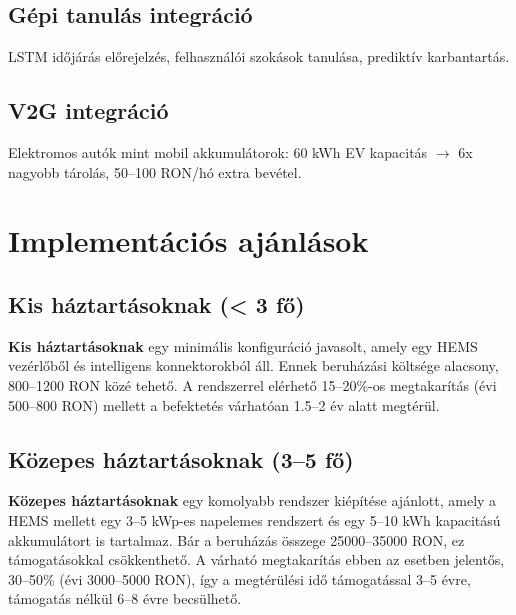 \subsection{Gépi tanulás integráció}
LSTM időjárás előrejelzés, felhasználói szokások tanulása, prediktív karbantartás.

\subsection{V2G integráció}
Elektromos autók mint mobil akkumulátorok: 60 kWh EV kapacitás $\rightarrow$ 6x nagyobb tárolás, 50--100 RON/hó extra bevétel.

\section{Implementációs ajánlások}
\subsection{Kis háztartásoknak (< 3 fő)}
\textbf{Kis háztartásoknak} egy minimális konfiguráció javasolt, amely egy HEMS vezérlőből és intelligens konnektorokból áll. Ennek beruházási költsége alacsony, 800--1200 RON közé tehető. A rendszerrel elérhető 15--20\%-os megtakarítás (évi 500--800 RON) mellett a befektetés várhatóan 1.5--2 év alatt megtérül.

\subsection{Közepes háztartásoknak (3--5 fő)}
\textbf{Közepes háztartásoknak} egy komolyabb rendszer kiépítése ajánlott, amely a HEMS mellett egy 3--5 kWp-es napelemes rendszert és egy 5--10 kWh kapacitású akkumulátort is tartalmaz. Bár a beruházás összege 25000--35000 RON, ez támogatásokkal csökkenthető. A várható megtakarítás ebben az esetben jelentős, 30--50\% (évi 3000--5000 RON), így a megtérülési idő támogatással 3--5 évre, támogatás nélkül 6--8 évre becsülhető.
